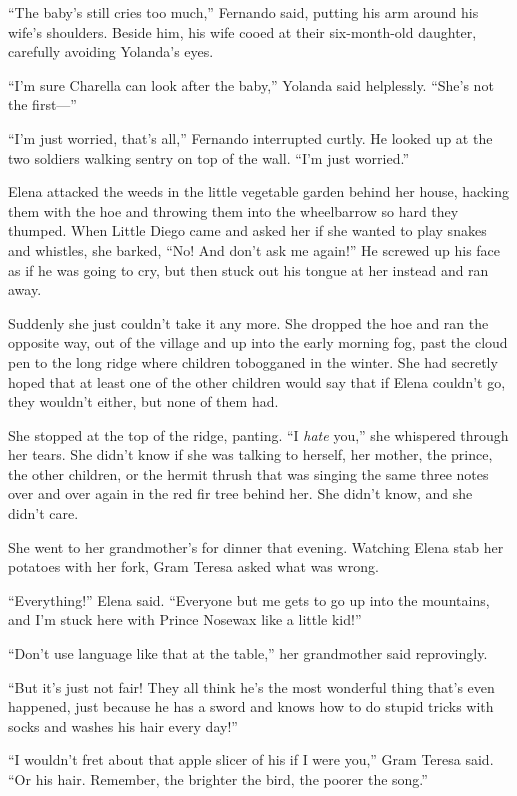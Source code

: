 \documentclass[10pt]{book}
\begin{document}
``The baby's still cries too much,'' Fernando said, putting his arm around his wife's shoulders. Beside him, his wife cooed at their six-month-old daughter, carefully avoiding Yolanda's eyes.

``I'm sure Charella can look after the baby,'' Yolanda said helplessly. ``She's not the first---''

``I'm just worried, that's all,'' Fernando interrupted curtly. He looked up at the two soldiers walking sentry on top of the wall. ``I'm just worried.''

Elena attacked the weeds in the little vegetable garden behind her house, hacking them with the hoe and throwing them into the wheelbarrow so hard they thumped. When Little Diego came and asked her if she wanted to play snakes and whistles, she barked, ``No! And don't ask me again!'' He screwed up his face as if he was going to cry, but then stuck out his tongue at her instead and ran away.

Suddenly she just couldn't take it any more. She dropped the hoe and ran the opposite way, out of the village and up into the early morning fog, past the cloud pen to the long ridge where children tobogganed in the winter. She had secretly hoped that at least one of the other children would say that if Elena couldn't go, they wouldn't either, but none of them had.

She stopped at the top of the ridge, panting. ``I \emph{hate} you,'' she whispered through her tears. She didn't know if she was talking to herself, her mother, the prince, the other children, or the hermit thrush that was singing the same three notes over and over again in the red fir tree behind her. She didn't know, and she didn't care.

She went to her grandmother's for dinner that evening. Watching Elena stab her potatoes with her fork, Gram Teresa asked what was wrong.

``Everything!'' Elena said. ``Everyone but me gets to go up into the mountains, and I'm stuck here with Prince Nosewax like a little kid!''

``Don't use language like that at the table,'' her grandmother said reprovingly.

``But it's just not fair! They all think he's the most wonderful thing that's even happened, just because he has a sword and knows how to do stupid tricks with socks and washes his hair every day!''

``I wouldn't fret about that apple slicer of his if I were you,'' Gram Teresa said. ``Or his hair. Remember, the brighter the bird, the poorer the song.''
\end{document}
